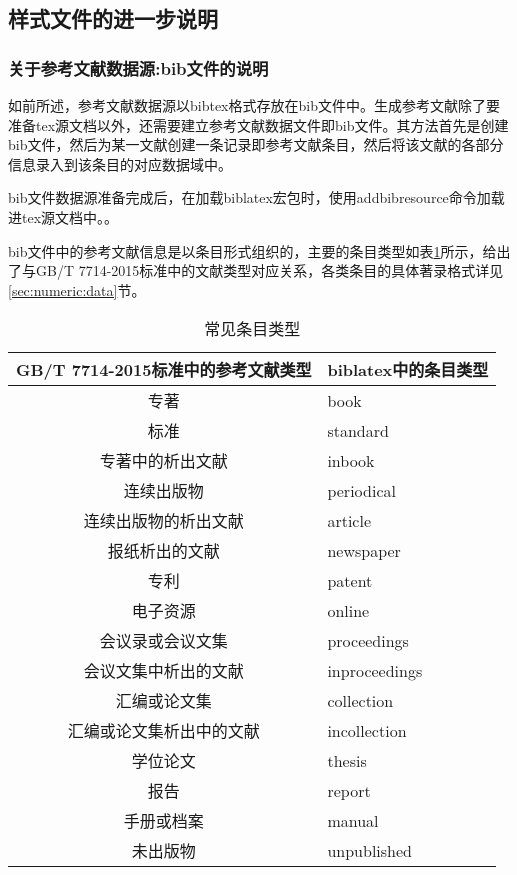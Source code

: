 \subsection{样式文件的进一步说明}

\subsubsection{关于参考文献数据源:bib文件的说明}\label{sec:bib:bibtex}

如前所述，参考文献数据源以bibtex格式存放在bib文件中。生成参考文献除了要准备tex源文档以外，还需要建立参考文献数据文件即bib文件。其方法首先是创建bib文件，然后为某一文献创建一条记录即参考文献条目，然后将该文献的各部分信息录入到该条目的对应数据域中。

bib文件数据源准备完成后，在加载biblatex宏包时，使用addbibresource命令加载进tex源文档中。。

bib文件中的参考文献信息是以条目形式组织的，主要的条目类型如表\ref{tab:entrytypes}所示，给出了与GB/T 7714-2015标准中的文献类型对应关系，各类条目的具体著录格式详见\ref{sec:numeric:data}节。
\begin{table}[!htb]
\centering
\caption{常见条目类型}\label{tab:entrytypes}
\begin{tabular}{cl}
\hline
  GB/T 7714-2015标准中的参考文献类型 &  biblatex中的条目类型\\ \hline
  专著& book\\
  标准& standard\\
  专著中的析出文献& inbook\\
  连续出版物& periodical\\
  连续出版物的析出文献& article\\
  报纸析出的文献& newspaper\\
  专利& patent\\
  电子资源& online\\
  会议录或会议文集& proceedings\\
  会议文集中析出的文献& inproceedings\\
  汇编或论文集& collection\\
  汇编或论文集析出中的文献& incollection\\
  学位论文& thesis\\
  报告& report\\
  手册或档案& manual\\
  未出版物& unpublished\\ \hline
  \end{tabular}
\end{table}

